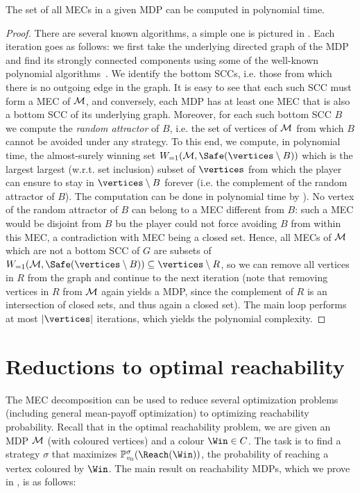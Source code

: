 \begin{theorem}
\label{5-thm:MEC-decomposition-complexity}
The set of all MECs in a given MDP can be computed in polynomial time.
\end{theorem}
\begin{proof}
There are several known algorithms, a simple one is pictured in . Each iteration goes as follows: we first take the underlying directed graph of the MDP and find its strongly connected components using some of the well-known polynomial algorithms~\cite{Cormen&Leiserson&Rivest&Stein:2009}. We identify the bottom SCCs, i.e. those from which there is no outgoing edge in the graph. It is easy to see that each such SCC must form a MEC of $\mathcal{M}$, and conversely, each MDP has at least one MEC that is also a bottom SCC of its underlying graph. Moreover, for each such bottom SCC $B $ we compute the \emph{random attractor} of $B$, i.e. the set of vertices of $\mathcal{M}$ from which $B$ cannot be avoided under any strategy. To this end, we compute, in polynomial time, the almost-surely winning set $ \winAS(\mdp,\Safe(\vertices \setminus B)) $ which is the largest largest (w.r.t. set inclusion) subset of $\vertices$ from which the player can ensure to stay in $\vertices \setminus B$ forever (i.e. the complement of the random attractor of $B$). The computation can be done in polynomial time by ). No vertex of the random attractor of $B$ can belong to a MEC different from $ B $: such a MEC would be disjoint from $ B $ bu the player could not force avoiding $ B $ from within this MEC, a contradiction with MEC being a closed set. Hence, all MECs of $\mathcal{M}$ which are not a bottom SCC of $G$ are subsets of $\winAS(\mdp,\Safe(\vertices \setminus B)) \subseteq \vertices \setminus R$, so we can remove all vertices in $R$ from the graph and continue to the next iteration (note that removing vertices in $R$ from $\mathcal{M}$ again yields a MDP, since the complement of $R$ is an intersection of closed sets, and thus again a closed set). The main loop performs at most $|\vertices|$ iterations, which yields the polynomial complexity.
\end{proof}

\section{Reductions to optimal reachability}

The MEC decomposition can be used to reduce several optimization problems (including general mean-payoff optimization) to optimizing reachability probability. Recall that in the optimal reachability problem, we are given an MDP $\mathcal{M}$ (with coloured vertices) and a colour $\Win \in\colours$. The task is to find a strategy $\sigma$ that maximizes $ \probm^\sigma_{\vinit}(\Reach(\Win))$, the probability of reaching a vertex coloured by $\Win$. The main result on reachability MDPs, which we prove in , is as follows:

